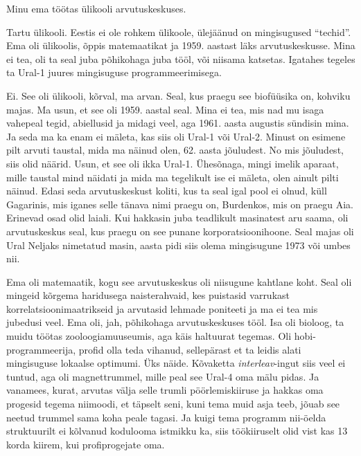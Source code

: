 

Minu ema töötas ülikooli arvutuskeskuses.


Tartu ülikooli. Eestis ei ole rohkem ülikoole,  ülejäänud on mingisugused \enquote{techid}. Ema oli ülikoolis, õppis matemaatikat ja 1959. aastast läks arvutuskeskusse. Mina ei tea,  oli ta seal juba põhikohaga juba tööl, või niisama katsetas. Igatahes tegeles ta Ural-1  juures mingisuguse programmeerimisega. 

Ei. See oli ülikooli, kõrval, ma arvan. Seal, kus praegu see biofüüsika on, kohviku majas.  Ma usun, et see oli 1959. aastal seal. Mina ei tea, mis nad mu isaga  vahepeal tegid,  abiellusid ja midagi veel, aga 1961. aasta augustis sündisin mina. Ja seda ma ka enam ei mäleta, kas siis oli Ural-1 või Ural-2. Minust on esimene pilt arvuti taustal, mida ma näinud olen, 62. aasta jõuludest. No mis jõuludest, siis olid näärid. Usun, et see oli ikka Ural-1. Ühesõnaga, mingi imelik aparaat, mille taustal mind näidati ja mida ma tegelikult ise ei mäleta, olen ainult pilti näinud. Edasi  seda arvutuskeskust koliti, kus ta seal igal pool ei olnud, küll Gagarinis, mis iganes selle tänava nimi praegu on, Burdenkos, mis on praegu Aia. Erinevad osad olid laiali. Kui hakkasin juba  teadlikult masinatest aru saama,  oli arvutuskeskus seal, kus praegu on see punane korporatsioonihoone. Seal majas oli Ural Neljaks nimetatud masin, aasta pidi siis olema mingisugune 1973 või umbes nii. 


Ema oli matemaatik, kogu see arvutuskeskus oli niisugune kahtlane koht. Seal oli mingeid kõrgema haridusega naisterahvaid, kes puistasid varrukast  korrelatsioonimaatrikseid ja arvutasid  lehmade poniteeti ja ma ei tea mis jubedusi veel. Ema oli, jah, põhikohaga arvutuskeskuses tööl. Isa oli bioloog, ta muidu töötas zooloogiamuuseumis, aga  käis haltuurat tegemas. Oli hobi-programmeerija, profid olla teda vihanud, sellepärast et ta leidis alati mingisuguse lokaalse optimumi. Üks näide. Kõvaketta \emph{interleav}-ingut siis veel ei tuntud, aga oli magnettrummel, mille peal see Ural-4 oma mälu pidas. Ja vanamees, kurat, arvutas välja selle trumli pöörlemiskiiruse ja hakkas oma progesid tegema niimoodi, et täpselt seni, kuni tema muid asja teeb, jõuab see neetud trummel sama koha peale tagasi. Ja kuigi tema programm nii-öelda struktuurilt ei kõlvanud kodulooma istmikku ka, siis töökiiruselt olid vist kas 13 korda kiirem, kui profiprogejate oma.

